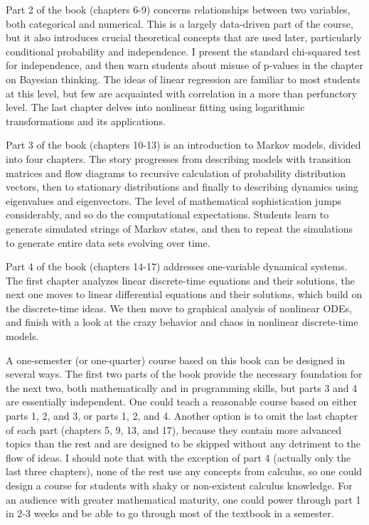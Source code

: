 \documentclass[
]{book}
\begin{document}
Part 2 of the book (chapters 6-9) concerns relationships between two variables, both categorical and numerical. This is a largely data-driven part of the course, but it also introduces crucial theoretical concepts that are used later, particularly conditional probability and independence. I present the standard chi-squared test for independence, and then warn students about misuse of p-values in the chapter on Bayesian thinking. The ideas of linear regression are familiar to most students at this level, but few are acquainted with correlation in a more than perfunctory level. The last chapter delves into nonlinear fitting using logarithmic transformations and its applications.

Part 3 of the book (chapters 10-13) is an introduction to Markov models, divided into four chapters. The story progresses from describing models with transition matrices and flow diagrams to recursive calculation of probability distribution vectors, then to stationary distributions and finally to describing dynamics using eigenvalues and eigenvectors. The level of mathematical sophistication jumps considerably, and so do the computational expectations. Students learn to generate simulated strings of Markov states, and then to repeat the simulations to generate entire data sets evolving over time.

Part 4 of the book (chapters 14-17) addresses one-variable dynamical systems. The first chapter analyzes linear discrete-time equations and their solutions, the next one moves to linear differential equations and their solutions, which build on the discrete-time ideas. We then move to graphical analysis of nonlinear ODEs, and finish with a look at the crazy behavior and chaos in nonlinear discrete-time models.

A one-semester (or one-quarter) course based on this book can be designed in several ways. The first two parts of the book provide the necessary foundation for the next two, both mathematically and in programming skills, but parts 3 and 4 are essentially independent. One could teach a reasonable course based on either parts 1, 2, and 3, or parts 1, 2, and 4. Another option is to omit the last chapter of each part (chapters 5, 9, 13, and 17), because they contain more advanced topics than the rest and are designed to be skipped without any detriment to the flow of ideas. I should note that with the exception of part 4 (actually only the last three chapters), none of the rest use any concepts from calculus, so one could design a course for students with shaky or non-existent calculus knowledge. For an audience with greater mathematical maturity, one could power through part 1 in 2-3 weeks and be able to go through most of the textbook in a semester.
\end{document}
